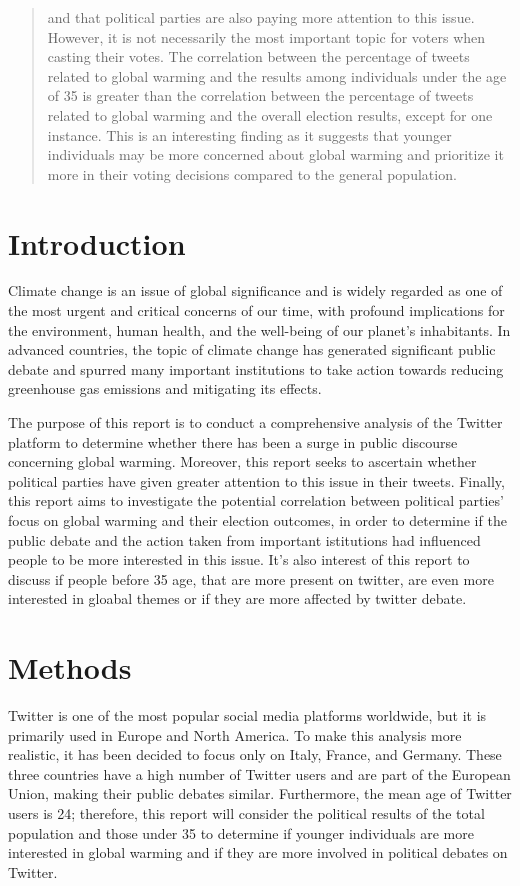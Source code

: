 \documentclass[a4paper,10pt,rmp,superscriptaddress]{revtex4}
\begin{document}
\begin{abstract}
    and that political parties are also paying more attention to this issue. 
    However, it is not necessarily the most important topic for voters when casting their votes. 
    The correlation between the percentage of tweets related to global warming and the results among individuals under the age of 35 is 
    greater than the correlation between the percentage of tweets related to global warming and the overall election results, 
    except for one instance. 
    This is an interesting finding as it suggests that younger individuals may be more concerned about global warming and prioritize it 
    more in their voting decisions compared to the general population.
\end{abstract}

\maketitle
\section*{Introduction}
Climate change is an issue of global significance and is widely regarded as one of the most urgent and critical concerns of our time, 
with profound implications for the environment, human health, and the well-being of our planet's inhabitants. 
In advanced countries, the topic of climate change has generated significant public debate and spurred many important institutions 
to take action towards reducing greenhouse gas emissions and mitigating its effects.

The purpose of this report is to conduct a comprehensive analysis of the Twitter platform to determine whether there has been a surge in 
public discourse concerning global warming. 
Moreover, this report seeks to ascertain whether political parties have given greater attention to this issue in their tweets. 
Finally, this report aims to investigate the potential correlation between political parties' focus on global warming and their election 
outcomes, in order to determine if the public debate and the action taken from important istitutions had influenced people to 
be more interested in this issue.
It's also interest of this report to discuss if people before 35 age, that are more present on twitter, are even more interested in 
gloabal themes or if they are more affected by twitter debate.

\section*{Methods}
Twitter is one of the most popular social media platforms worldwide, but it is primarily used in Europe and North America. 
To make this analysis more realistic, it has been decided to focus only on Italy, France, and Germany. 
These three countries have a high number of Twitter users and are part of the European Union, making their public debates similar. 
Furthermore, the mean age of Twitter users is 24; therefore, this report will consider the political results of the total 
population and those under 35 to determine if younger individuals are more interested in global warming and if they are more 
involved in political debates on Twitter.
\end{document}
